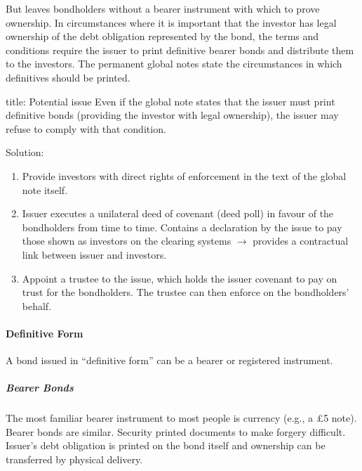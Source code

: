 \documentclass[
]{article}
\newenvironment{Shaded}{}{}
\newcommand{\NormalTok}[1]{#1}
\providecommand{\tightlist}{%
  \setlength{\itemsep}{0pt}\setlength{\parskip}{0pt}}
\begin{document}
But leaves bondholders without a bearer instrument with which to prove
ownership. In circumstances where it is important that the investor has
legal ownership of the debt obligation represented by the bond, the
terms and conditions require the issuer to print definitive bearer bonds
and distribute them to the investors. The permanent global notes state
the circumstances in which definitives should be printed.

\begin{Shaded}
\begin{Highlighting}[]
\NormalTok{title: Potential issue}
\NormalTok{Even if the global note states that the issuer must print definitive bonds (providing the investor with legal ownership), the issuer may refuse to comply with that condition.}
\end{Highlighting}
\end{Shaded}

Solution:

\begin{enumerate}
\def\labelenumi{\arabic{enumi}.}
\tightlist
\item
  Provide investors with direct rights of enforcement in the text of the
  global note itself.
\item
  Issuer executes a unilateral deed of covenant (deed poll) in favour of
  the bondholders from time to time. Contains a declaration by the issue
  to pay those shown as investors on the clearing systems
  \(\rightarrow\) provides a contractual link between issuer and
  investors.
\item
  Appoint a trustee to the issue, which holds the issuer covenant to pay
  on trust for the bondholders. The trustee can then enforce on the
  bondholders' behalf.
\end{enumerate}

\hypertarget{definitive-form}{%
\paragraph{Definitive Form}\label{definitive-form}}

A bond issued in ``definitive form'' can be a bearer or registered
instrument.

\hypertarget{bearer-bonds}{%
\subparagraph{Bearer Bonds}\label{bearer-bonds}}

The most familiar bearer instrument to most people is currency (e.g., a
£5 note). Bearer bonds are similar. Security printed documents to make
forgery difficult. Issuer's debt obligation is printed on the bond
itself and ownership can be transferred by physical delivery.
\end{document}
